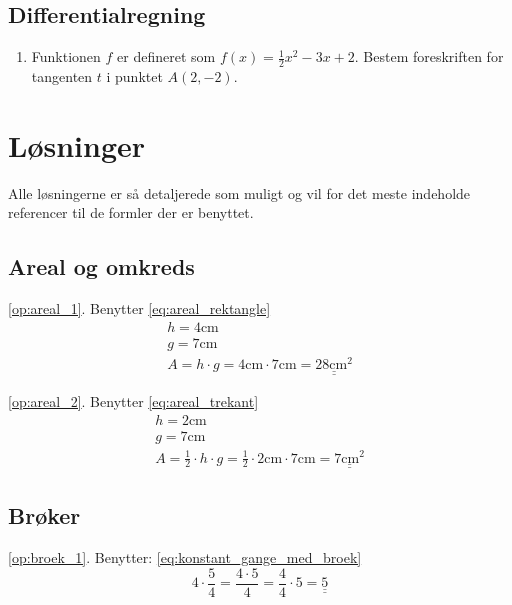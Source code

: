 \documentclass[11pt,a5paper,fleqn,leqno]{book}
\begin{document}
\section{Differentialregning}

\begin{enumerate}
\item \label{op:diff_1} Funktionen $f$ er defineret som $f(x) = \frac{1}{2}x^2 - 3x + 2$. Bestem foreskriften for tangenten $t$ i punktet $A(2,-2)$.
\end{enumerate}

\chapter{Løsninger} \label{ch:Loesninger}

Alle løsningerne er så detaljerede som muligt og vil for det meste indeholde referencer til de formler der er benyttet.

\newpage

\section{Areal og omkreds}

\ref{op:areal_1}. Benytter \eqref{eq:areal_rektangle}
\begin{displaymath}\begin{array}{l}
h = 4\text{cm}\\
g = 7\text{cm}\\
A = h \cdot g = 4\text{cm} \cdot 7\text{cm} = \underline{\underline{28\text{cm}^2}}
\end{array}\end{displaymath}

\ref{op:areal_2}. Benytter \eqref{eq:areal_trekant}
\begin{displaymath}\begin{array}{l}
h = 2\text{cm}\\
g = 7\text{cm}\\
A = \frac{1}{2} \cdot h \cdot g = \frac{1}{2} \cdot 2\text{cm} \cdot 7\text{cm} = \underline{\underline{7\text{cm}^2}}
\end{array}\end{displaymath}

\section{Brøker}

\ref{op:broek_1}. Benytter: \eqref{eq:konstant_gange_med_broek}
\[4 \cdot \frac{5}{4} = \frac{4 \cdot 5}{4} = \frac{4}{4} \cdot 5 = \underline{\underline{5}}\]
\end{document}
